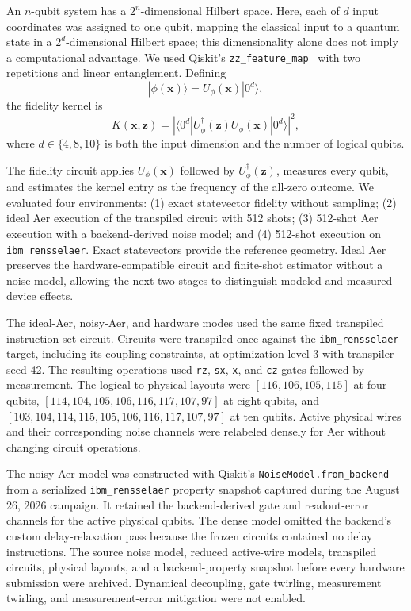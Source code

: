 \documentclass[letterpaper]{article} %
\begin{document}
An $n$-qubit system has a $2^n$-dimensional Hilbert space. Here, each of $d$ input coordinates was assigned to one qubit, mapping the classical input to a quantum state in a $2^d$-dimensional Hilbert space; this dimensionality alone does not imply a computational advantage. We used Qiskit's \texttt{zz\_feature\_map}~\cite{qiskit2024} with two repetitions and linear entanglement. Defining
\[
|\phi(\mathbf{x})\rangle=U_{\phi}(\mathbf{x})|0^d\rangle,
\]
the fidelity kernel is
\begin{equation}
K(\mathbf{x},\mathbf{z})=
\left|\langle 0^d|U_{\phi}^{\dagger}(\mathbf{z})
U_{\phi}(\mathbf{x})|0^d\rangle\right|^2,
\label{eq:fidelity-kernel}
\end{equation}
where $d\in\{4,8,10\}$ is both the input dimension and the number of logical qubits.

The fidelity circuit applies $U_{\phi}(\mathbf{x})$ followed by $U_{\phi}^{\dagger}(\mathbf{z})$, measures every qubit, and estimates the kernel entry as the frequency of the all-zero outcome. We evaluated four environments: (1) exact statevector fidelity without sampling; (2) ideal Aer execution of the transpiled circuit with 512 shots; (3) 512-shot Aer execution with a backend-derived noise model; and (4) 512-shot execution on \texttt{ibm\_rensselaer}. Exact statevectors provide the reference geometry. Ideal Aer preserves the hardware-compatible circuit and finite-shot estimator without a noise model, allowing the next two stages to distinguish modeled and measured device effects.

The ideal-Aer, noisy-Aer, and hardware modes used the same fixed transpiled instruction-set circuit. Circuits were transpiled once against the \texttt{ibm\_rensselaer} target, including its coupling constraints, at optimization level 3 with transpiler seed 42. The resulting operations used \texttt{rz}, \texttt{sx}, \texttt{x}, and \texttt{cz} gates followed by measurement. The logical-to-physical layouts were $[116,106,105,115]$ at four qubits, $[114,104,105,106,116,117,107,97]$ at eight qubits, and $[103,104,114,115,105,106,116,117,107,97]$ at ten qubits. Active physical wires and their corresponding noise channels were relabeled densely for Aer without changing circuit operations.

The noisy-Aer model was constructed with Qiskit's \texttt{NoiseModel.from\_backend} from a serialized \texttt{ibm\_rensselaer} property snapshot captured during the August 26, 2026 campaign. It retained the backend-derived gate and readout-error channels for the active physical qubits. The dense model omitted the backend's custom delay-relaxation pass because the frozen circuits contained no delay instructions. The source noise model, reduced active-wire models, transpiled circuits, physical layouts, and a backend-property snapshot before every hardware submission were archived. Dynamical decoupling, gate twirling, measurement twirling, and measurement-error mitigation were not enabled.
\end{document}
